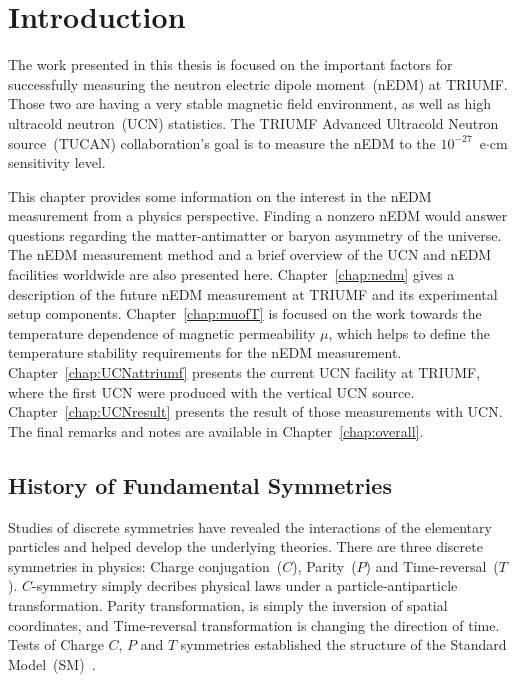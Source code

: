 \chapter{Introduction\label{chap:intro}}
\renewcommand{\thepage}{\arabic{page}}%
\setcounter{page}{1}%


The work presented in this thesis is focused on the important factors
for successfully measuring the neutron electric dipole moment~(nEDM)
at TRIUMF. Those two are having a very stable magnetic field
environment, as well as high ultracold neutron~(UCN) statistics. The
TRIUMF Advanced Ultracold Neutron source~(TUCAN) collaboration's goal
is to measure the nEDM to the $10^{-27}$~e$\cdot$cm sensitivity level.


This chapter provides some information on the interest in the nEDM
measurement from a physics perspective. Finding a nonzero nEDM would
answer questions regarding the matter-antimatter or baryon asymmetry
of the universe. The nEDM measurement method and a brief overview of
the UCN and nEDM facilities worldwide are also presented here.
Chapter~\ref{chap:nedm} gives a description of the future nEDM
measurement at TRIUMF and its experimental setup
components. Chapter~\ref{chap:muofT} is focused on the work towards
the temperature dependence of magnetic permeability $\mu$, which helps
to define the temperature stability requirements for the nEDM
measurement. Chapter~\ref{chap:UCNattriumf} presents the current UCN
facility at TRIUMF, where the first UCN were produced with the
vertical UCN source. Chapter~\ref{chap:UCNresult} presents the result
of those measurements with UCN. The final remarks and notes are
available in Chapter~\ref{chap:overall}.



\section{History of Fundamental Symmetries }

Studies of discrete symmetries have revealed the interactions of the
elementary particles and helped develop the underlying theories.
There are three discrete symmetries in physics: Charge
conjugation~($C$), Parity~($P$) and Time-reversal~($T$). $C$-symmetry
simply decribes physical laws under a particle-antiparticle
transformation. Parity transformation, is simply the inversion of
spatial coordinates, and Time-reversal transformation is changing the
direction of time.  Tests of Charge $C$, $P$ and $T$ symmetries
established the structure of the Standard
Model~(SM)~\cite{pospelov2005electric}.


